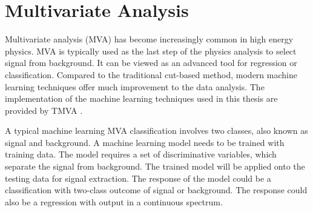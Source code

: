\section{Multivariate Analysis}
\label{sec:pandoraMVA}

Multivariate analysis (MVA) has become increasingly common in high energy physics. MVA is typically used as the last step of the physics analysis to select signal from background. It can be viewed as an advanced tool for regression or classification. Compared to the traditional cut-based method, modern machine learning techniques offer much improvement to the data analysis. The implementation of the machine learning techniques used in this thesis are provided by  TMVA \cite{Hocker:2007ht}.

A typical machine learning MVA classification involves two classes, also known as signal and background. A machine learning model needs to be trained with training data. The model requires a set of discriminative variables, which separate the signal from background. The trained model will be applied onto the testing data for signal extraction. The response of the model could be a classification with two-class outcome of  signal or background.   The response  could also be a regression with output in a continuous spectrum.

